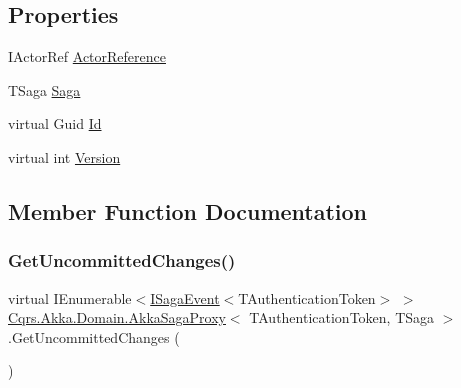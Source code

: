 \subsection*{Properties}
\begin{DoxyCompactItemize}
\item 
I\+Actor\+Ref \hyperlink{classCqrs_1_1Akka_1_1Domain_1_1AkkaSagaProxy_a5f1a7eae545d74336856ca7ec7625334}{Actor\+Reference}
\item 
T\+Saga \hyperlink{classCqrs_1_1Akka_1_1Domain_1_1AkkaSagaProxy_ac63a109e223eb4f046ebe9ad22b9a850}{Saga}
\item 
virtual Guid \hyperlink{classCqrs_1_1Akka_1_1Domain_1_1AkkaSagaProxy_acb65bb91f7dfacc6eca8e12b6a772b20}{Id}
\item 
virtual int \hyperlink{classCqrs_1_1Akka_1_1Domain_1_1AkkaSagaProxy_ab6272400fe5c6227a11cf5c93f752d4d}{Version}
\end{DoxyCompactItemize}


\subsection{Member Function Documentation}
\mbox{\label{classCqrs_1_1Akka_1_1Domain_1_1AkkaSagaProxy_a8cad3415bc5474a01bfdb2db3a852ea5}} 
\subsubsection{\texorpdfstring{Get\+Uncommitted\+Changes()}{GetUncommittedChanges()}}
{\footnotesize\ttfamily virtual I\+Enumerable$<$\hyperlink{interfaceCqrs_1_1Events_1_1ISagaEvent}{I\+Saga\+Event}$<$T\+Authentication\+Token$>$ $>$ \hyperlink{classCqrs_1_1Akka_1_1Domain_1_1AkkaSagaProxy}{Cqrs.\+Akka.\+Domain.\+Akka\+Saga\+Proxy}$<$ T\+Authentication\+Token, T\+Saga $>$.Get\+Uncommitted\+Changes (\begin{DoxyParamCaption}{ }\end{DoxyParamCaption})\hspace{0.3cm}{\ttfamily [virtual]}}



